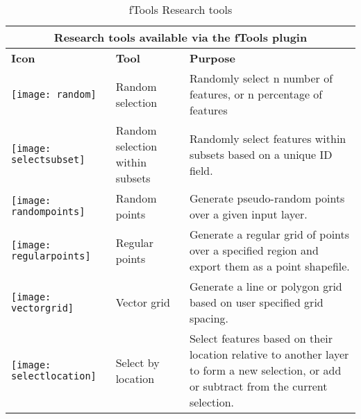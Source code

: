 \begin{table}[ht]
\centering
\caption{fTools Research tools}\label{tab:ftool_research}\medskip
 \begin{tabular}{|p{0.3in}|p{1.3in}|p{4.6in}|}
 \hline \multicolumn{3}{|c|}{\textbf{Research tools available via the fTools plugin}} \\
 \hline \textbf{Icon} & \textbf{Tool} & \textbf{Purpose} \\
 \hline \texttt{[image: random]} & Random selection & Randomly 
select n number of features, or n percentage of features \\
 \hline \texttt{[image: selectsubset]} & Random selection within 
subsets & Randomly select features within subsets based on a unique ID field. \\
 \hline \texttt{[image: randompoints]} & Random points & Generate 
pseudo-random points over a given input layer. \\
 \hline \texttt{[image: regularpoints]} & Regular points & Generate 
a regular grid of points over a specified region and export them as a point shapefile. \\
 \hline \texttt{[image: vectorgrid]} & Vector grid & Generate a 
line or polygon grid based on user specified grid spacing. \\
 \hline \texttt{[image: selectlocation]} & Select by location & 
Select features based on their location relative to another layer to form a 
new selection, or add or subtract from the current selection. \\
 \hline
\end{tabular}
\end{table}

